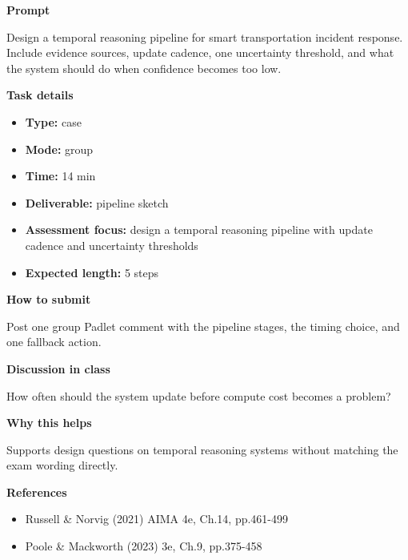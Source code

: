 \documentclass[11pt]{article}
\begin{document}
\begin{tcolorbox}[colback=white,colframe=MidnightBlue,title={Q4 Collaborative Mini-Case},fonttitle=\bfseries,breakable]
\begin{center}
\end{center}

{\large\bfseries\color{MidnightBlue} Prompt}\par\medskip
Design a temporal reasoning pipeline for smart transportation incident response. Include evidence sources, update cadence, one uncertainty threshold, and what the system should do when confidence becomes too low.

{\large\bfseries\color{MidnightBlue} Task details}\par\medskip
\begin{itemize}\item \textbf{Type:} case
\item \textbf{Mode:} group
\item \textbf{Time:} 14 min
\item \textbf{Deliverable:} pipeline sketch
\item \textbf{Assessment focus:} design a temporal reasoning pipeline with update cadence and uncertainty thresholds
\item \textbf{Expected length:} 5 steps\end{itemize}

{\large\bfseries\color{MidnightBlue} How to submit}\par\medskip
Post one group Padlet comment with the pipeline stages, the timing choice, and one fallback action.

{\large\bfseries\color{MidnightBlue} Discussion in class}\par\medskip
How often should the system update before compute cost becomes a problem?

{\large\bfseries\color{MidnightBlue} Why this helps}\par\medskip
Supports design questions on temporal reasoning systems without matching the exam wording directly.

{\large\bfseries\color{MidnightBlue} References}\par\medskip
\begin{itemize}\item Russell \& Norvig (2021) AIMA 4e, Ch.14, pp.461-499
\item Poole \& Mackworth (2023) 3e, Ch.9, pp.375-458\end{itemize}
\end{tcolorbox}
\end{document}
